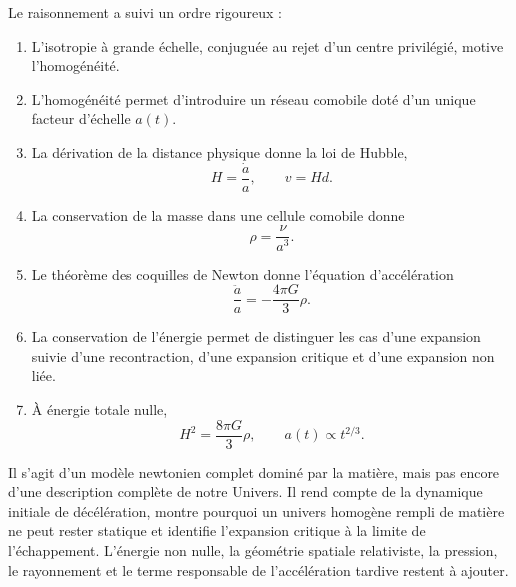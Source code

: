 Le raisonnement a suivi un ordre rigoureux :
\begin{enumerate}
\item L’isotropie à grande échelle, conjuguée au rejet d’un centre privilégié, motive l’homogénéité.
\item L’homogénéité permet d’introduire un réseau comobile doté d’un unique facteur d’échelle \(a(t)\).
\item La dérivation de la distance physique donne la loi de Hubble,
  \[
  H=\frac{\dot a}{a},
  \qquad
  v=Hd.
  \]
\item La conservation de la masse dans une cellule comobile donne
  \[
  \rho=\frac{\nu}{a^3}.
  \]
\item Le théorème des coquilles de Newton donne l’équation d’accélération
  \[
  \frac{\ddot a}{a}=-\frac{4\pi G}{3}\rho.
  \]
\item La conservation de l’énergie permet de distinguer les cas d’une expansion suivie d’une recontraction, d’une expansion critique et d’une expansion non liée.
\item À énergie totale nulle,
  \[
  H^2=\frac{8\pi G}{3}\rho,
  \qquad
  a(t)\propto t^{2/3}.
  \]
\end{enumerate}

Il s’agit d’un modèle newtonien complet dominé par la matière, mais pas encore d’une description complète de notre Univers. Il rend compte de la dynamique initiale de décélération, montre pourquoi un univers homogène rempli de matière ne peut rester statique et identifie l’expansion critique à la limite de l’échappement. L’énergie non nulle, la géométrie spatiale relativiste, la pression, le rayonnement et le terme responsable de l’accélération tardive restent à ajouter.
